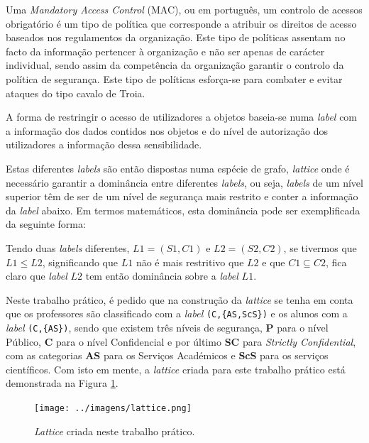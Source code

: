 \documentclass[../tp2.tex]{subfiles}
\begin{document}
Uma \textit{Mandatory Access Control} (MAC), ou em português, um controlo de acessos obrigatório é um tipo de política que corresponde a atribuir os direitos de acesso baseados nos regulamentos da organização. Este tipo de políticas assentam no facto da informação pertencer à organização e não ser apenas de carácter individual, sendo assim da competência da organização garantir o controlo da política de segurança. Este tipo de políticas esforça-se para combater e evitar ataques do tipo cavalo de Troia. \par 
A forma de restringir o acesso de utilizadores a objetos baseia-se numa \textit{label} com a informação dos dados contidos nos objetos e do nível de autorização dos utilizadores a informação dessa sensibilidade.\par 
Estas diferentes \textit{labels} são então dispostas numa espécie de grafo, \textit{lattice} onde é necessário garantir a dominância entre diferentes \textit{labels}, ou seja, \textit{labels} de um nível superior têm de ser de um nível de segurança mais restrito e conter a informação da \textit{label} abaixo. Em termos matemáticos, esta dominância pode ser exemplificada da seguinte forma:\par 
Tendo duas \textit{labels} diferentes, $L1 = (S1,C1)$ e $L2 = (S2,C2)$, se tivermos que $L1 \leq L2 $, significando que $L1$ não é mais restritivo que $L2$ e que $C1 \subseteq C2$, fica claro que \textit{label} $L2$ tem então dominância sobre a \textit{label} $L1$.\par 
Neste trabalho prático, é pedido que na construção da \textit{lattice} se tenha em conta que os professores são classificado com a \textit{label} \texttt{(C,\{AS,ScS\})} e os alunos com a \textit{label} \texttt{(C,\{AS\})}, sendo que existem três níveis de segurança, \textbf{P} para o nível Público, \textbf{C} para o nível Confidencial e por último \textbf{SC} para \textit{Strictly Confidential}, com as categorias \textbf{AS} para os Serviços Académicos e \textbf{ScS} para os serviços científicos.
Com isto em mente, a \textit{lattice} criada para este trabalho prático está demonstrada na Figura \ref{fig:lattice}.

\begin{figure}[H]\centering \captionsetup{justification=centering,margin=2cm} \centerline{\texttt{[image: ../imagens/lattice.png]}} \caption{\textit{Lattice} criada neste trabalho prático.} \label{fig:lattice}

\end{figure}
\end{document}
